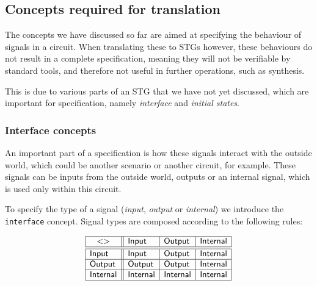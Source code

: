 \documentclass[british,conference,compsoc]{IEEEtran}
\begin{document}
\subsection{Concepts required for translation\label{sub:trans-concepts}}

\vspace{-2mm}

The concepts we have discussed so far are aimed at specifying the behaviour of 
signals in a circuit. When translating these to STGs however, these behaviours 
do not result in a complete specification, meaning they will not be 
verifiable by standard tools, and therefore not useful in further operations, 
such as synthesis.

This is due to various parts of an STG that we have not yet discussed, which 
are important for specification, namely \emph{interface} and 
\emph{initial states}.

\vspace{-3mm}

\subsubsection{Interface concepts\label{sub:interface}} 

An important part of a specification is how these signals interact with the 
outside world, which could be another scenario or another circuit, for example.
These signals can be inputs from the outside world, outputs or an internal 
signal, which is used only within this circuit. 

To specify the type of a signal (\emph{input},
\emph{output} or \emph{internal}) we introduce the \texttt{interface} concept.
Signal types are composed according to the following rules:

\vspace{-2mm}

\[
\begin{array}{|l||l|l|l|}
\hline
\multicolumn{1}{|c||}{<>} & \mathsf{Input} & \mathsf{Output} &
\mathsf{Internal} \\ \hline \hline
\mathsf{Input} & \mathsf{Input} & \mathsf{Output} & \mathsf{Internal} \\ \hline
\mathsf{Output} & \mathsf{Output} & \mathsf{Output} & \mathsf{Internal} \\
\hline
\mathsf{Internal}& \mathsf{Internal} & \mathsf{Internal} & \mathsf{Internal} \\
\hline
\end{array}
\]
\end{document}
